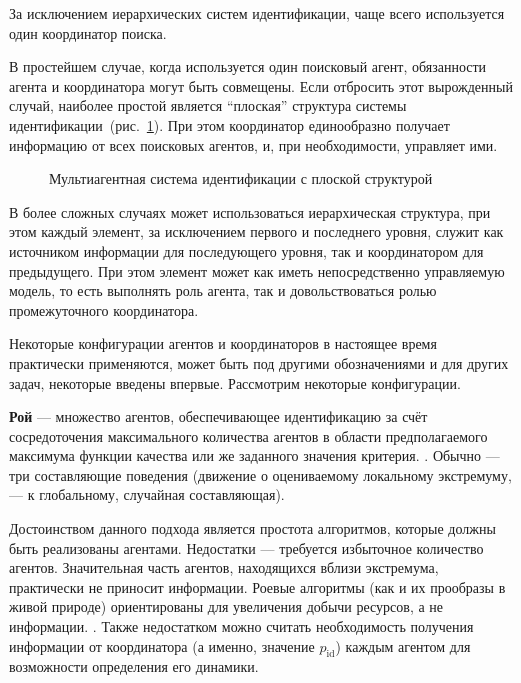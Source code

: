 За исключением иерархических систем идентификации,
чаще всего используется один координатор поиска.

В простейшем случае, когда используется один поисковый агент,
обязанности агента и координатора могут быть совмещены.
Если отбросить этот вырожденный случай,
наиболее простой является ``плоская'' структура системы идентификации~(рис.~\ref{atu:f:agents_flat}).
При этом координатор единообразно получает информацию от всех поисковых агентов,
и, при необходимости, управляет ими.

\begin{figure}[htb!]
\begin{center}

\end{center}
\caption{Мультиагентная система идентификации с плоской структурой}
\label{atu:f:agents_flat}
\end{figure}

В более сложных случаях может использоваться иерархическая структура,
при этом каждый элемент, за исключением первого и последнего
уровня, служит как источником информации для последующего
уровня, так и координатором для предыдущего. При этом элемент
может как иметь непосредственно управляемую модель,
то есть выполнять роль агента, так и довольствоваться ролью промежуточного
координатора.

Некоторые конфигурации агентов и координаторов
в настоящее время практически применяются,
может быть под другими обозначениями и для других задач,
некоторые введены впервые.
Рассмотрим некоторые конфигурации.

\textbf{ Рой } --- множество агентов, обеспечивающее идентификацию за счёт
сосредоточения максимального количества агентов
в области предполагаемого максимума функции качества или же
заданного значения критерия. .
Обычно --- три составляющие поведения
(движение о оцениваемому локальному экстремуму, --- к глобальному, случайная составляющая).



Достоинством данного подхода является простота алгоритмов,
которые должны быть реализованы агентами.
Недостатки --- требуется избыточное количество агентов.
Значительная часть агентов, находящихся вблизи экстремума,
практически не приносит информации. Роевые
алгоритмы (как и их прообразы в живой природе) ориентированы
для увеличения добычи ресурсов, а не информации. .
Также недостатком можно считать необходимость
получения информации от координатора (а именно, значение $p_\mathrm{id}$)
каждым агентом для возможности определения его динамики.

